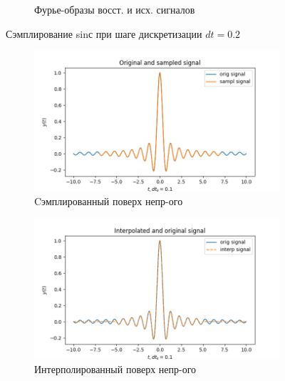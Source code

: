 \documentclass[a4paper, 12pt]{article}
\begin{document}
\begin{figure}[H]
\begin{subfigure}{0.45\textwidth}
            \caption{Фурье-образы восст. и исх. сигналов}
            \label{fig:fisinc1}
        \end{subfigure}
        \caption{Сэмплирование sinс при шаге дискретизации $dt=0.2$}
        \label{fig:sincs1}
    \end{figure}
    \begin{figure}[H]
        \centering
        \begin{subfigure}{0.45\textwidth}
            \centering
            \includegraphics[width=\linewidth]{2_sinc.png}
            \caption{Cэмплированный поверх непр-ого}
            \label{fig:sinc2}
        \end{subfigure}
        \hspace{5mm}
        \begin{subfigure}{0.45\textwidth}
            \centering
            \includegraphics[width=\linewidth]{2_isinc.png}
            \caption{Интерполированный поверх непр-ого}
            \label{fig:isinc2}
        \end{subfigure}
        \begin{subfigure}{0.45\textwidth}

\end{subfigure}
\end{figure}
\end{document}
